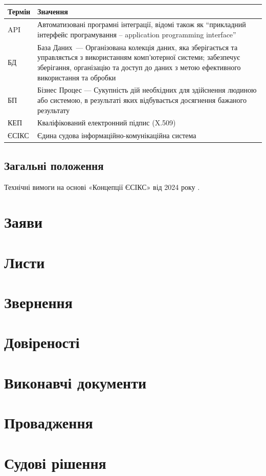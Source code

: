 \documentclass{article}
\begin{document}
\begin{longtable}{p{4cm}p{10cm}}
\toprule
\textbf{Термін} & \textbf{Значення} \\
\midrule
API & Автоматизовані програмні інтеграції, відомі також як “прикладний інтерфейс програмування – application programming interface” \\
БД & База Даних — Організована колекція даних, яка зберігається та управляється з використанням комп'ютерної системи; забезпечує зберігання, організацію та доступ до даних з метою ефективного використання та обробки \\
БП & Бізнес Процес — Сукупність дій необхідних для здійснення людиною або системою, в результаті яких відбувається досягнення бажаного результату \\
КЕП & Кваліфікований електронний підпис (X.509) \\
ЄСІКС & Єдина судова інформаційно-комунікаційна система \\
\bottomrule
\end{longtable}

\subsection*{Загальні положення}

Технічні вимоги на основі «Концепції ЄСІКС» від 2024 року \cite{esiks}.

\newpage
\section{Заяви}
\section{Листи}
\section{Звернення}
\section{Довіреності}
\section{Виконавчі документи}
\section{Провадження}
\section{Судові рішення}
\end{document}
